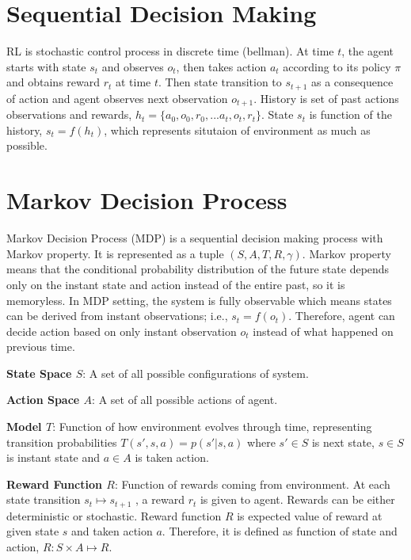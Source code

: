 \section{Sequential Decision Making}

RL is stochastic control process in discrete time (bellman).
At time $t$, the agent starts with state $s_t$ and observes $o_t$, then takes action $a_t$ according to its policy $\pi$ and obtains reward $r_t$ at time $t$. Then state transition to $s_{t+1}$ as a consequence of action and agent observes next observation $o_{t+1}$. History is set of past actions observations and rewards, $h_t=\{ a_0, o_0, r_0, ... a_t, o_t, r_t\}$. State $s_t$ is function of the history, $s_t=f(h_t)$, which represents situtaion of environment as much as possible.

\section{Markov Decision Process}
\label{sec:mdp}

Markov Decision Process (MDP) is a sequential decision making process with Markov property. It is represented as a tuple $(S,A,T,R,\gamma)$. Markov property means that the conditional probability distribution of the future state depends only on the instant state and action instead of the entire past, so it is memoryless. In MDP setting, the system is fully observable which means states can be derived from instant observations; i.e., $s_t=f(o_t)$. Therefore, agent can decide action based on only instant observation $o_t$ instead of what happened on previous time.

\textbf{State Space $S$}: A set of all possible configurations of system. 

\textbf{Action Space $A$}: A set of all possible actions of agent.

\textbf{Model $T$}: Function of how environment evolves through time, representing transition probabilities $T(s',s,a) = p(s'|s,a)$ where $s' \in S$ is next state, $s \in S$ is instant state and $a \in A$ is taken action. 

\textbf{Reward Function $R$}: Function of rewards coming from environment. At each state transition $s_t \mapsto s_{t+1}$ , a reward $r_t$ is given to agent. Rewards can be either deterministic or stochastic. Reward function $R$ is expected value of reward at given state $s$ and taken action $a$. Therefore, it is defined as function of state and action, $R \colon S \times A \mapsto R$.

